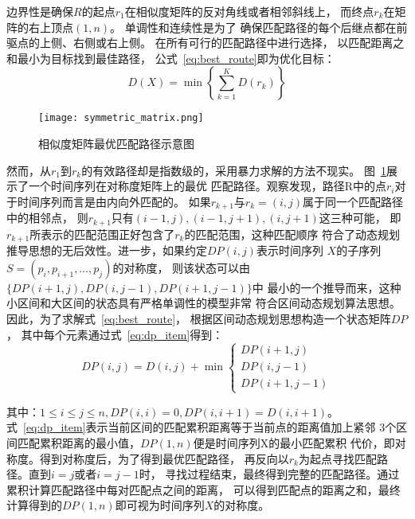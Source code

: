 边界性是确保$R$的起点$r_1$在相似度矩阵的反对角线或者相邻斜线上，
而终点$r_k$在矩阵的右上顶点$\left(1,n\right)$。
单调性和连续性是为了
确保匹配路径的每个后继点都在前驱点的上侧、右侧或右上侧。
在所有可行的匹配路径中进行选择，
以匹配距离之和最小为目标找到最佳路径，
公式~\ref{eq:best_route}即为优化目标：
\begin{equation}
  D(X)=\min \left\{\sum_{k=1}^{K} D\left(r_{k}\right)\right\}
  \label{eq:best_route}
\end{equation}

\begin{figure}
  \centering
  \texttt{[image: symmetric\_matrix.png]}
  \caption{相似度矩阵最优匹配路径示意图}
  \label{fig:symmetric_matrix}
\end{figure}

然而，从$r_1$到$r_k$的有效路径却是指数级的，采用暴力求解的方法不现实。
图~\ref{fig:symmetric_matrix}展示了一个时间序列在对称度矩阵上的最优
匹配路径。观察发现，路径R中的点$r_i$对于时间序列而言是由内向外匹配的。
如果$r_{k+1}$与$r_k=\left(i,j\right)$属于同一个匹配路径中的相邻点，
则$r_{k+1}$只有$(i-1, j),(i-1, j+1),(i, j+1)$这三种可能，
即$r_{k+1}$所表示的匹配范围正好包含了$r_k$的匹配范围，这种匹配顺序
符合了动态规划推导思想的无后效性。进一步，如果约定$D P(i, j)$表示时间序列
$X$的子序列$S=\left(p_{i}, p_{i+1}, \dots, p_{j}\right)$的对称度，
则该状态可以由$\{D P(i+1, j), D P(i, j-1), D P(i+1, j-1)\}$中
最小的一个推导而来，这种小区间和大区间的状态具有严格单调性的模型非常
符合区间动态规划算法思想。因此，为了求解式~\ref{eq:best_route}，
根据区间动态规划思想构造一个状态矩阵$DP$， 
其中每个元素通过式~\ref{eq:dp_item}得到：
\begin{equation}
  D P(i, j)=D(i, j)+\min \left\{\begin{array}{c}
    D P(i+1, j) \\
    D P(i, j-1) \\
    D P(i+1, j-1)
  \end{array}\right.
  \label{eq:dp_item}
\end{equation}

其中：$1 \leq i \leq j \leq n, D P(i, i)=0, D P(i, i+1)=D(i, i+1)$。
式~\ref{eq:dp_item}表示当前区间的匹配累积距离等于当前点的距离值加上紧邻
3个区间匹配累积距离的最小值，$D P(1, n)$便是时间序列X的最小匹配累积
代价，即对称度。得到对称度后，为了得到最优匹配路径，
再反向以$r_k$为起点寻找匹配路径。直到$i=j$或者$i=j-1$时，
寻找过程结束，最终得到完整的匹配路径。通过累积计算匹配路径中每对匹配点之间的距离，
可以得到匹配点的距离之和，最终计算得到的$DP(1,n)$即可视为时间序列$X$的对称度。

